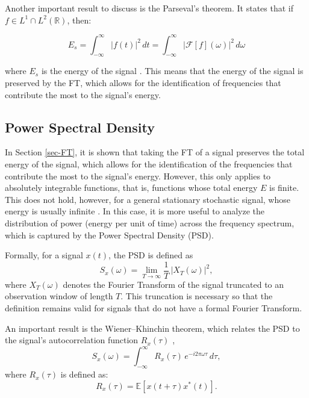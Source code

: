 Another important result to discuss is the Parseval's theorem. It states that if $f \in L^1 \cap L^2(\mathbb{R})$, then:

\begin{equation}
    E_s = \int_{-\infty}^{\infty} |f(t)|^2\,dt = \int_{-\infty}^{\infty} |\mathcal{F}[f](\omega)|^2\,d\omega
    \label{eq:Parseval}
\end{equation}

\noindent where $E_s$ is the energy of the signal \cite{grochenig2001foundations}. This means that the energy of the signal is preserved by the FT, which allows for the identification of frequencies that contribute the most to the signal's energy. 


\subsection{Power Spectral Density} \label{sec-PSD}

In Section \ref{sec-FT}, it is shown that taking the FT of a signal preserves the total energy of the signal, which allows for the identification of the frequencies that contribute the most to the signal's energy. However, this only applies to absolutely integrable functions, that is, functions whose total energy $E$ is finite. This does not hold, however, for a general stationary stochastic signal, whose energy is usually infinite \cite{kay1981spectrum}. In this case, it is more useful to analyze the distribution of power (energy per unit of time) across the frequency spectrum, which is captured by the Power Spectral Density (PSD).

Formally, for a signal $x(t)$, the PSD is defined as \cite{youngworth2005overview}
\begin{equation}
    S_x(\omega) = \lim_{T \to \infty} \frac{1}{T} \, \left| X_T(\omega) \right|^2,
    \label{eq:psd_definition}
\end{equation}
where $X_T(\omega)$ denotes the Fourier Transform of the signal truncated to an observation window of length $T$. This truncation is necessary so that the definition remains valid for signals that do not have a formal Fourier Transform.

An important result is the Wiener--Khinchin theorem, which relates the PSD to the signal's autocorrelation function $R_x(\tau)$ \cite{kay1981spectrum},
\begin{equation}
    S_x(\omega) = \int_{-\infty}^{\infty} R_x(\tau) \, e^{-i 2\pi \omega \tau} \, d\tau,
    \label{eq:wiener_khinchin}
\end{equation}
\noindent where $R_x(\tau)$ is defined as:
\begin{equation}
    R_x(\tau) = \mathbb{E}[x(t + \tau)x^*(t)].
\end{equation}

